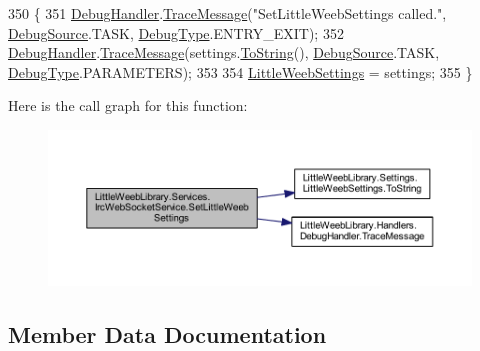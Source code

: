 \begin{DoxyCode}
350         \{
351             \mbox{\hyperlink{class_little_weeb_library_1_1_handlers_1_1_debug_handler}{DebugHandler}}.\mbox{\hyperlink{class_little_weeb_library_1_1_handlers_1_1_debug_handler_afccb37dfd6b2114af72000c2f4fe4607}{TraceMessage}}(\textcolor{stringliteral}{"SetLittleWeebSettings called."}, 
      \mbox{\hyperlink{namespace_little_weeb_library_1_1_handlers_a2a6ca0775121c9c503d58aa254d292be}{DebugSource}}.TASK, \mbox{\hyperlink{namespace_little_weeb_library_1_1_handlers_ab66019ed40462876ec4e61bb3ccb0a62}{DebugType}}.ENTRY\_EXIT);
352             \mbox{\hyperlink{class_little_weeb_library_1_1_handlers_1_1_debug_handler}{DebugHandler}}.\mbox{\hyperlink{class_little_weeb_library_1_1_handlers_1_1_debug_handler_afccb37dfd6b2114af72000c2f4fe4607}{TraceMessage}}(settings.\mbox{\hyperlink{class_little_weeb_library_1_1_settings_1_1_little_weeb_settings_a5a5b722dd8e117be810022882795b6ae}{ToString}}(), 
      \mbox{\hyperlink{namespace_little_weeb_library_1_1_handlers_a2a6ca0775121c9c503d58aa254d292be}{DebugSource}}.TASK, \mbox{\hyperlink{namespace_little_weeb_library_1_1_handlers_ab66019ed40462876ec4e61bb3ccb0a62}{DebugType}}.PARAMETERS);
353 
354             \mbox{\hyperlink{class_little_weeb_library_1_1_settings_1_1_little_weeb_settings}{LittleWeebSettings}} = settings;
355         \}
\end{DoxyCode}
Here is the call graph for this function\+:\nopagebreak
\begin{figure}[H]
\begin{center}
\leavevmode
\includegraphics[width=350pt]{class_little_weeb_library_1_1_services_1_1_irc_web_socket_service_a48697b5d89c2899e73d1ecf7492bd083_cgraph}
\end{center}
\end{figure}


\subsection{Member Data Documentation}
\mbox{\label{class_little_weeb_library_1_1_services_1_1_irc_web_socket_service_a44141a0f98eabf4a14c1c4da0ddf77f1}} 
